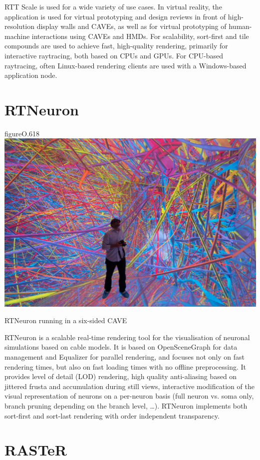 RTT Scale is used for a wide variety of use cases. In virtual reality, the
application is used for virtual prototyping and design reviews in front of
high-resolution display walls and CAVEs, as well as for virtual prototyping of
human-machine interactions using CAVEs and HMDs. For scalability, sort-first and
tile compounds are used to achieve fast, high-quality rendering, primarily for
interactive raytracing, both based on CPUs and GPUs. For CPU-based raytracing,
often Linux-based rendering clients are used with a Windows-based application
node.

\section{RTNeuron}\label{sRTNeuron}

\begin{wrapfloat}{figure}{O}{.618\textwidth}
  \includegraphics[width=.618\textwidth]{images/RTNeuron}
  {\caption{\label{fRTNeuron}RTNeuron running in a six-sided CAVE}}
\end{wrapfloat}

RTNeuron \cite{HBBES:13} is a scalable real-time rendering tool for the
visualisation of neuronal simulations based on cable models. It is based on
OpenSceneGraph for data management and Equalizer for parallel rendering, and
focuses not only on fast rendering times, but also on fast loading times with no
offline preprocessing. It provides level of detail (LOD) rendering, high quality
anti-aliasing based on jittered frusta and accumulation during still views,
interactive modification of the visual representation of neurons on a per-neuron
basis (full neuron vs. soma only, branch pruning depending on the branch level,
\dots). RTNeuron implements both sort-first and sort-last rendering with order
independent transparency.

\section{RASTeR}

